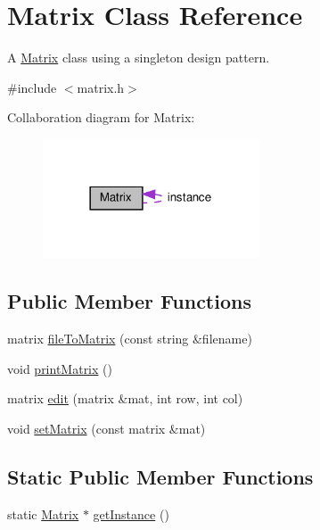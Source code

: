 \hypertarget{class_matrix}{}\section{Matrix Class Reference}
\label{class_matrix}


A \hyperlink{class_matrix}{Matrix} class using a singleton design pattern.  




{\ttfamily \#include $<$matrix.\+h$>$}



Collaboration diagram for Matrix\+:\nopagebreak
\begin{figure}[H]
\begin{center}
\leavevmode
\includegraphics[width=182pt]{class_matrix__coll__graph}
\end{center}
\end{figure}
\subsection*{Public Member Functions}
\begin{DoxyCompactItemize}
\item 
matrix \hyperlink{class_matrix_a35eb9dcb01c552fea1f5926db35339ef}{file\+To\+Matrix} (const string \&filename)
\item 
void \hyperlink{class_matrix_aa1967ad240a5ffaf492800044b7275d9}{print\+Matrix} ()
\item 
matrix \hyperlink{class_matrix_af7211d71bc56bc860886ef51e2ffb1e3}{edit} (matrix \&mat, int row, int col)
\item 
void \hyperlink{class_matrix_a8c45dd1354fa25e14065cab23f3074c0}{set\+Matrix} (const matrix \&mat)
\end{DoxyCompactItemize}
\subsection*{Static Public Member Functions}
\begin{DoxyCompactItemize}
\item 
static \hyperlink{class_matrix}{Matrix} $\ast$ \hyperlink{class_matrix_a0c8e09a50ddb4d068d39456ea130abcc}{get\+Instance} ()
\end{DoxyCompactItemize}
